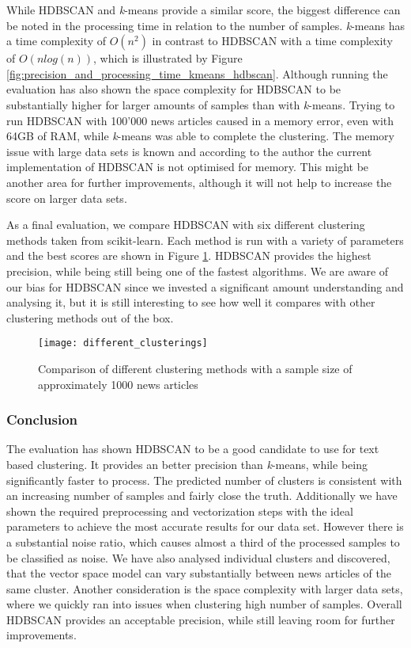 While HDBSCAN and \textit{k}-means provide a similar score, the biggest difference can be noted in the processing time in relation to the number of samples. \textit{k}-means has a time complexity of $O(n^2)$ in contrast to HDBSCAN with a time complexity of $O(nlog(n))$, which is illustrated by Figure \ref{fig:precision_and_processing_time_kmeans_hdbscan}. Although running the evaluation has also shown the space complexity for HDBSCAN to be substantially higher for larger amounts of samples than with \textit{k}-means. Trying to run HDBSCAN with 100'000 news articles caused in a memory error, even with 64GB of RAM, while \textit{k}-means was able to complete the clustering. The memory issue with large data sets is known and according to the author the current implementation of HDBSCAN is not optimised for memory\cite{hdbscan_memory_issue}. This might be another area for further improvements, although it will not help to increase the score on larger data sets.

As a final evaluation, we compare HDBSCAN with six different clustering methods taken from scikit-learn. Each method is run with a variety of parameters and the best scores are shown in Figure \ref{fig:different_clusterings}. HDBSCAN provides the highest precision, while being still being one of the fastest algorithms. We are aware of our bias for HDBSCAN since we invested a significant amount understanding and analysing it, but it is still interesting to see how well it compares with other clustering methods out of the box.

\begin{figure}[h]
    \centering
    \texttt{[image: different\_clusterings]}
    \caption{Comparison of different clustering methods with a sample size of approximately 1000 news articles}
    \label{fig:different_clusterings}
\end{figure}

\subsubsection{Conclusion}

The evaluation has shown HDBSCAN to be a good candidate to use for text based clustering. It provides an better precision than \textit{k}-means, while being significantly faster to process. The predicted number of clusters is consistent with an increasing number of samples and fairly close the truth. Additionally we have shown the required preprocessing and vectorization steps with the ideal parameters to achieve the most accurate results for our data set. However there is a substantial noise ratio, which causes almost a third of the processed samples to be classified as noise. We have also analysed individual clusters and discovered, that the vector space model can vary substantially between news articles of the same cluster. Another consideration is the space complexity  with larger data sets, where we quickly ran into issues when clustering high number of samples. Overall HDBSCAN provides an acceptable precision, while still leaving room for further improvements.